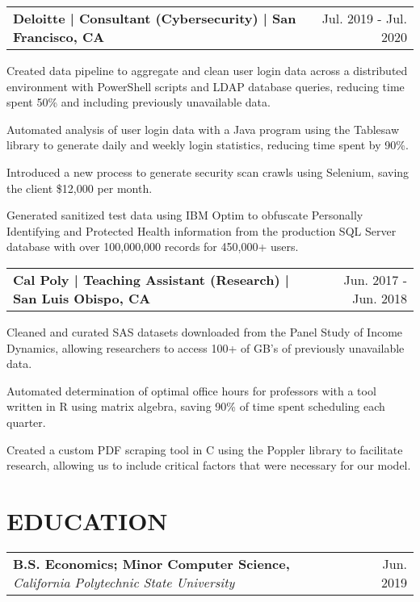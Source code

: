 \documentclass{article}
\makeatletter
\newcommand{\beginResumeList}{\begin{itemize}\setlength\itemsep{0em}\begin{minipage}{0.9\textwidth}}
\newcommand{\resumeListEnd}{\end{minipage}\end{itemize}}
\newcommand{\normalItem}[1]{\normalsize\item{#1}}
\newcommand{\experience}[2]{
  \begin{tabular*}{\textwidth}[t]{l@{\extracolsep{\fill}}r}
    \normalsize\textbf{#1} & \normalsize #2 \\
  \end{tabular*}
}
\newcommand{\education}[3]{
  \begin{tabular*}{\textwidth}[t]{l@{\extracolsep{\fill}}r}
    \normalsize\textbf{#1, }\textit{#2} & \normalsize #3 \\
  \end{tabular*}\vspace{-10pt}
}
\makeatother
\begin{document}
  \experience
    {Deloitte | Consultant (Cybersecurity) | San Francisco, CA}
    {Jul. 2019 - Jul. 2020}
    \beginResumeList
      \normalItem{Created data pipeline to aggregate and clean user login data across a distributed environment with PowerShell scripts and LDAP database queries, reducing time spent 50\% and including previously unavailable data.}
      \normalItem{Automated analysis of user login data with a Java program using the Tablesaw library to generate daily and weekly login statistics, reducing time spent by 90\%.}
      \normalItem{Introduced a new process to generate security scan crawls using Selenium, saving the client \$12,000 per month.}
      \normalItem{Generated sanitized test data using IBM Optim to obfuscate Personally Identifying and Protected Health information from the production SQL Server database with over 100,000,000 records for 450,000+ users.}
    \resumeListEnd


  \experience
    {Cal Poly | Teaching Assistant (Research) | San Luis Obispo, CA}
    {Jun. 2017 - Jun. 2018}
    \beginResumeList
      \normalItem{Cleaned and curated SAS datasets downloaded from the Panel Study of Income Dynamics, allowing researchers to access 100+ of GB's of previously unavailable data.}
      \normalItem{Automated determination of optimal office hours for professors with a tool written in R using matrix algebra, saving 90\% of time spent scheduling each quarter.}
      \normalItem{Created a custom PDF scraping tool in C using the Poppler library to facilitate research, allowing us to include critical factors that were necessary for our model.}
    \resumeListEnd

\section{EDUCATION}
  \education
    {B.S. Economics; Minor Computer Science}
    {California Polytechnic State University}
    {Jun. 2019}
\end{document}
